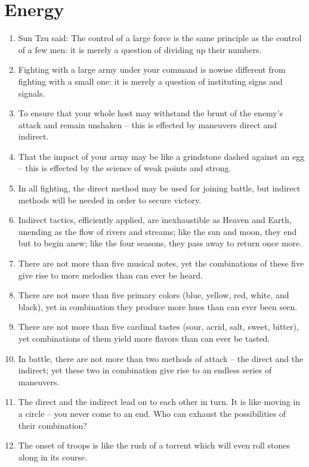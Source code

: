 \documentclass[oneside]{book}
\begin{document}
\chapter{Energy}
\begin{enumerate}
	\item Sun Tzu said: The control of a large force is the same principle as the control of a few men: it is merely a question of dividing up their numbers.
	\item Fighting with a large army under your command is nowise different from fighting with a small one: it is merely a question of instituting signs and signals.
	\item To ensure that your whole host may withstand the brunt of the enemy's attack and remain unshaken – this is effected by maneuvers direct and indirect.
	\item That the impact of your army may be like a grindstone dashed against an egg – this is effected by the science of weak points and strong.
	\item In all fighting, the direct method may be used for joining battle, but indirect methods will be needed in order to secure victory.
	\item Indirect tactics, efficiently applied, are inexhaustible as Heaven and Earth, unending as the flow of rivers and streams; like the sun and moon, they end but to begin anew; like the four seasons, they pass away to return once more.
	\item There are not more than five musical notes, yet the combinations of these five give rise to more melodies than can ever be heard.
	\item There are not more than five primary colors (blue, yellow, red, white, and black), yet in combination they produce more hues than can ever been seen.
	\item There are not more than five cardinal tastes (sour, acrid, salt, sweet, bitter), yet combinations of them yield more flavors than can ever be tasted.
	\item In battle, there are not more than two methods of attack – the direct and the indirect; yet these two in combination give rise to an endless series of maneuvers.
	\item The direct and the indirect lead on to each other in turn. It is like moving in a circle – you never come to an end. Who can exhaust the possibilities of their combination?
	\item The onset of troops is like the rush of a torrent which will even roll stones along in its course.

\end{enumerate}
\end{document}
